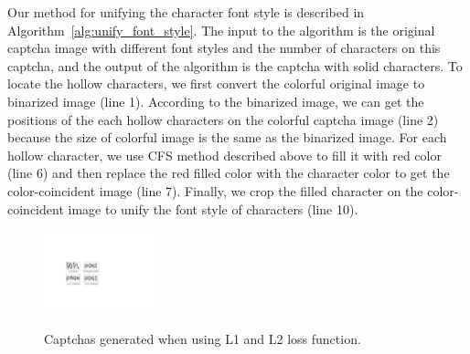Our method for unifying the character font style is described in Algorithm~\ref{alg:unify_font_style}.
The input to the algorithm is the original captcha image with different font styles and the number of characters on this captcha, and the output of the algorithm is the captcha with solid characters. To locate the hollow characters, we first convert the colorful original image to binarized image (line 1). According to the binarized image, we can get the positions of the each hollow characters on the colorful captcha image (line 2) because the size of colorful image is the same as the binarized image. For each hollow character, we use CFS method described above to fill it with red color (line 6) and then replace the red filled color with the character color to get the color-coincident image (line 7). Finally, we crop the filled character on the color-coincident image to unify the font style of characters (line 10).

\begin{figure}
  \centering
  \includegraphics[width=0.3\textwidth]{fig/loss_anlysis/captcha_generated.pdf} \\
  \caption{Captchas generated when using L1 and L2 loss function.}
  \label{fig: L1_L2}
\end{figure}

